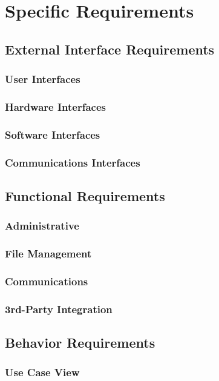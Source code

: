 
\section{Specific Requirements}\label{sec:specific-requirements}
    \subsection{External Interface Requirements}\label{sec:external-interface-requirements}
        \subsubsection{User Interfaces}\label{sec:user-interfaces}
        \subsubsection{Hardware Interfaces}\label{sec:hardware-interfaces}
        \subsubsection{Software Interfaces}\label{sec:software-interfaces}
        \subsubsection{Communications Interfaces}\label{sec:communications-interfaces}
    \subsection{Functional Requirements}\label{sec:functional-requirements}
        \subsubsection{Administrative}\label{sec:administrative-functions}
        \subsubsection{File Management}\label{sec:file-management-functions}
        \subsubsection{Communications}\label{sec:communications-functions}
        \subsubsection{3rd-Party Integration}\label{sec:3rd-party-integration-functions}
    \subsection{Behavior Requirements}\label{sec:behavior-requirements}
        \subsubsection{Use Case View}\label{sec:use-case-view}
